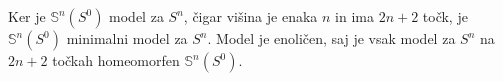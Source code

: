 
Ker je $\mathds{S}^n(S^0)$ model za $S^n$, čigar višina je enaka $n$ in ima 
$2n+2$ točk, je $\mathds{S}^n(S^0)$ minimalni model za $S^n$. Model je 
enoličen, saj je vsak model za $S^n$ na $2n+2$ točkah homeomorfen 
$\mathds{S}^n(S^0)$.
